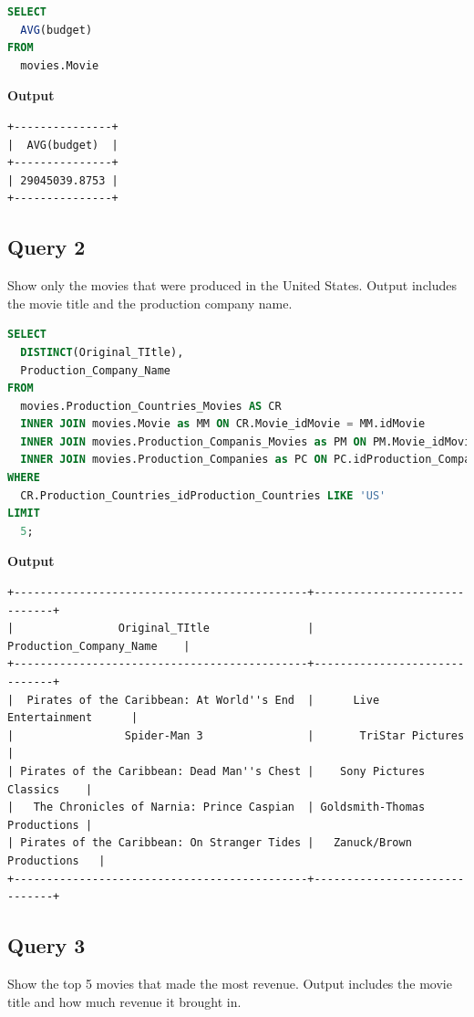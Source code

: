 \documentclass{article}
\begin{document}
\begin{lstlisting}[language=SQL]
SELECT 
  AVG(budget) 
FROM 
  movies.Movie
\end{lstlisting}

\textbf{Output}
\begin{lstlisting}
+---------------+
|  AVG(budget)  |
+---------------+
| 29045039.8753 |
+---------------+
\end{lstlisting}

\subsection{Query 2}
Show only the movies that were produced in the United States. Output includes the movie title and the production company name.

\begin{lstlisting}[language=SQL]
SELECT 
  DISTINCT(Original_TItle), 
  Production_Company_Name 
FROM 
  movies.Production_Countries_Movies AS CR 
  INNER JOIN movies.Movie as MM ON CR.Movie_idMovie = MM.idMovie 
  INNER JOIN movies.Production_Companis_Movies as PM ON PM.Movie_idMovie = MM.idMovie 
  INNER JOIN movies.Production_Companies as PC ON PC.idProduction_Companies = PM.Movie_idMovie 
WHERE 
  CR.Production_Countries_idProduction_Countries LIKE 'US' 
LIMIT 
  5;

\end{lstlisting}

\textbf{Output}
\begin{lstlisting}
+---------------------------------------------+------------------------------+
|                Original_TItle               |   Production_Company_Name    |
+---------------------------------------------+------------------------------+
|  Pirates of the Caribbean: At World''s End  |      Live Entertainment      |
|                 Spider-Man 3                |       TriStar Pictures       |
| Pirates of the Caribbean: Dead Man''s Chest |    Sony Pictures Classics    |
|   The Chronicles of Narnia: Prince Caspian  | Goldsmith-Thomas Productions |
| Pirates of the Caribbean: On Stranger Tides |   Zanuck/Brown Productions   |
+---------------------------------------------+------------------------------+
\end{lstlisting}

\subsection{Query 3}
Show the top 5 movies that made the most revenue. Output includes the movie title and how much revenue it brought in.
\end{document}
